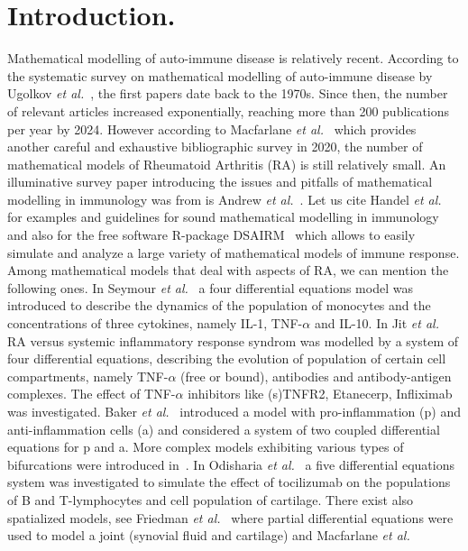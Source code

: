 \documentclass[a4paper, 12pt]{article}
\providecommand{\DIFaddtex}[1]{{\protect\color{blue} \sf #1}} %
\providecommand{\DIFdeltex}[1]{{\protect\color{red} \scriptsize #1}} %
\providecommand{\DIFaddbegin}{} %
\providecommand{\DIFaddend}{} %
\providecommand{\DIFdelbegin}{} %
\providecommand{\DIFdelend}{} %
\providecommand{\DIFadd}[1]{\texorpdfstring{\DIFaddtex{#1}}{#1}} %
\providecommand{\DIFdel}[1]{\texorpdfstring{\DIFdeltex{#1}}{}} %
\begin{document}
\section{Introduction.}
Mathematical modelling of  auto-immune disease is relatively recent.
According to the systematic survey on mathematical modelling of auto-immune disease by  Ugolkov \textit{et al.}~\cite{frontiers2024},
the ﬁrst papers date back to the 1970s. Since
then, the number of relevant articles increased exponentially,
reaching more than 200 publications per year by 2024. 
However according to Macfarlane \textit{et al.}~\cite{macfarlane2020} which provides another careful and exhaustive bibliographic survey in 2020, the number of  mathematical models of Rheumatoid Arthritis (RA) is still relatively small.
An illuminative survey paper introducing the issues and pitfalls of mathematical modelling in immunology \DIFdelbegin \DIFdel{was from }\DIFdelend \DIFaddbegin \DIFadd{is }\DIFaddend Andrew \textit{et al.}~\cite{andrew}. 
Let us cite Handel \textit{et al.}~\cite{Handel2020} for  examples and guidelines for sound mathematical modelling in immunology and also for the free software R-package DSAIRM~\cite{dsairm2019} which allows to easily simulate and analyze a large variety of mathematical models of immune response.
Among mathematical models that deal with aspects
of RA, we can mention the following ones.
In Seymour \textit{et al.}~\cite{seymour2001} a four differential equations model was introduced to describe the dynamics of the population of monocytes and the concentrations of three cytokines, namely IL-1, TNF-$\alpha$ and IL-10. 
In Jit \textit{et al.}~\cite{jit2005} RA versus systemic inflammatory response syndrom was modelled by a system of four differential equations, describing the evolution of population of certain cell compartments, namely TNF-$\alpha$ (free or bound), antibodies and antibody-antigen complexes.
The effect of TNF-$\alpha$ inhibitors like (s)TNFR2, Etanecerp, Infliximab was investigated.
Baker \textit{et al.}~\cite{baker2013} introduced a model with pro-inﬂammation 
(p) and anti-inﬂammation cells (a) and considered a system of two coupled differential equations for p and a. 
More complex models exhibiting various types of  bifurcations were introduced in~\cite{baker2017}. 
In Odisharia \textit{et al.}~\cite{jaiani2019} a five differential equations system was investigated to simulate the effect of tocilizumab on the populations of B and T-lymphocytes and cell population of cartilage.  
There exist also spatialized models, see Friedman \textit{et al.}~\cite{friedman} where partial differential equations were used to model a joint (synovial fluid and cartilage) and  Macfarlane \textit{et al.}~\cite{macfarlane2022}
\end{document}

